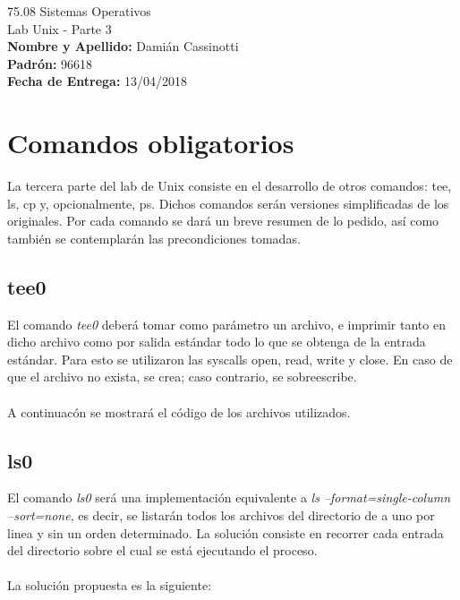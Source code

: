 \documentclass[a4paper, 12pt]{article}
\begin{document}
		
	\begin{titlepage}
		\vspace*{\fill}
		\begin{center}
			\Large 75.08 Sistemas Operativos \\
			\Huge Lab Unix - Parte 3 \\
			\bigskip\bigskip\bigskip
			\large\textbf{Nombre y Apellido:} Damián Cassinotti \\
			\textbf{Padrón:} 96618 \\
			\textbf{Fecha de Entrega:} 13/04/2018\\
					
		\end{center}
		\vspace*{\fill}
	\end{titlepage}
	\pagenumbering{arabic}
	\newpage
			
	\tableofcontents
	\newpage
	
	\section{Comandos obligatorios}
		La tercera parte del lab de Unix consiste en el desarrollo de otros comandos: tee, ls, cp y, opcionalmente, ps. Dichos comandos serán versiones simplificadas de los originales. Por cada comando se dará un breve resumen de lo pedido, así como también se contemplarán las precondiciones tomadas.
		\subsection{tee0}
		El comando \textit{tee0} deberá tomar como parámetro un archivo, e imprimir tanto en dicho archivo como por salida estándar todo lo que se obtenga de la entrada estándar. Para esto se utilizaron las syscalls open, read, write y close. En caso de que el archivo no exista, se crea; caso contrario, se sobreescribe.\\\\
		A continuacón se mostrará el código de los archivos utilizados.
		
		\bigskip\bigskip\bigskip
		
		
		\subsection{ls0}
		El comando \textit{ls0} será una implementación equivalente a \textit{ls --format=single-column --sort=none}, es decir, se listarán todos los archivos del directorio de a uno por linea y sin un orden determinado. La solución consiste en recorrer cada entrada del directorio sobre el cual se está ejecutando el proceso.\\\\
		La solución propuesta es la siguiente: 
		
		\bigskip\bigskip\bigskip
		
	
\end{document}
